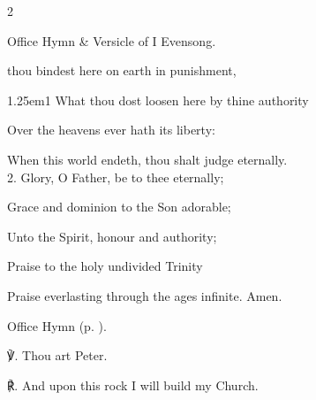 \begin{paracol}{2}
\secondEvensong
{}

\secondEvensongHymn
\begin{rubric}
	Office Hymn \& Versicle of I Evensong.
\end{rubric}



\switchcolumn


\vspace{-1\baselineskip}


\mattins
{}

\mattinsInvitatoryHymn
{} thou bindest here on earth in punishment,


\begin{hangparas}{1.25em}{1}
What thou dost loosen here by thine authority

Over the heavens ever hath its liberty:

When this world endeth, thou shalt judge eternally.\\

2. Glory, O Father, be to thee eternally;

Grace and dominion to the Son adorable;

Unto the Spirit, honour and authority;

Praise to the holy undivided Trinity

Praise everlasting through the ages infinite. Amen.
\end{hangparas}

\mattinsOfficeHymn
\begin{rubric}
	Office Hymn  (p. \pageref{CathedraAntioch}).
\end{rubric}

℣. Thou art Peter.

℟. And upon this rock I will build my Church.


\fussy	
\end{paracol}


